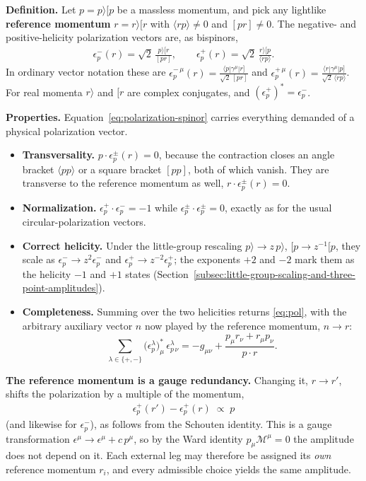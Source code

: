 \textbf{Definition.} Let $p = p\rangle [p$ be a massless momentum, and pick any lightlike \textbf{reference momentum} $r = r\rangle [r$ with $\langle r p\rangle \neq 0$ and $[p r] \neq 0$. The negative- and positive-helicity polarization vectors are, as bispinors,
\begin{align}
	\label{eq:polarization-spinor}
	\epsilon_p^{-}(r) = \sqrt{2}\,\frac{p\rangle [r}{[p r]},
	\qquad
	\epsilon_p^{+}(r) = \sqrt{2}\,\frac{r\rangle [p}{\langle r p\rangle}.
\end{align}
In ordinary vector notation these are $\epsilon_p^{-\,\mu}(r) = \frac{\langle p|\gamma^\mu|r]}{\sqrt{2}\,[p r]}$ and $\epsilon_p^{+\,\mu}(r) = \frac{\langle r|\gamma^\mu|p]}{\sqrt{2}\,\langle r p\rangle}$. For real momenta $r\rangle$ and $[r$ are complex conjugates, and $\left( \epsilon_p^{+} \right)^{*} = \epsilon_p^{-}$.

\textbf{Properties.} Equation~\eqref{eq:polarization-spinor} carries everything demanded of a physical polarization vector.
\begin{itemize}
	\item \textbf{Transversality.} $p \cdot \epsilon_p^{\pm}(r) = 0$, because the contraction closes an angle bracket $\langle p p\rangle$ or a square bracket $[p p]$, both of which vanish. They are transverse to the reference momentum as well, $r \cdot \epsilon_p^{\pm}(r) = 0$.
	\item \textbf{Normalization.} $\epsilon_p^{+}\cdot \epsilon_p^{-} = -1$ while $\epsilon_p^{\pm}\cdot \epsilon_p^{\pm} = 0$, exactly as for the usual circular-polarization vectors.
	\item \textbf{Correct helicity.} Under the little-group rescaling $p\rangle \to z\,p\rangle$, $[p \to z^{-1}[p$, they scale as $\epsilon_p^{-} \to z^{2}\epsilon_p^{-}$ and $\epsilon_p^{+} \to z^{-2}\epsilon_p^{+}$; the exponents $+2$ and $-2$ mark them as the helicity $-1$ and $+1$ states (Section~\ref{subsec:little-group-scaling-and-three-point-amplitudes}).
	\item \textbf{Completeness.} Summing over the two helicities returns \eqref{eq:pol}, with the arbitrary auxiliary vector $n$ now played by the reference momentum, $n \to r$:
	\[
		\sum_{\lambda \in \{+,-\}} \big( \epsilon_p^{\lambda} \big)^{*}_{\mu}\, \epsilon_{p\,\nu}^{\lambda}
		= -g_{\mu\nu} + \frac{p_\mu r_\nu + r_\mu p_\nu}{p \cdot r}.
	\]
\end{itemize}

\textbf{The reference momentum is a gauge redundancy.} Changing it, $r \to r'$, shifts the polarization by a multiple of the momentum,
\begin{align}
	\label{eq:reference-gauge-shift}
	\epsilon_p^{+}(r') - \epsilon_p^{+}(r) \;\propto\; p
\end{align}
(and likewise for $\epsilon_p^{-}$), as follows from the Schouten identity. This is a gauge transformation $\epsilon^\mu \to \epsilon^\mu + c\,p^\mu$, so by the Ward identity $p_\mu \mathcal{M}^\mu = 0$ the amplitude does not depend on it. Each external leg may therefore be assigned its \emph{own} reference momentum $r_i$, and every admissible choice yields the same amplitude.

